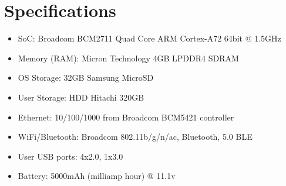 \documentclass[12pt]{article}
\begin{document}
\pagebreak

\section{Specifications}
\begin{itemize}
\item SoC: Broadcom BCM2711 Quad Core ARM Cortex-A72 64bit @ 1.5GHz
\item Memory (RAM): Micron Technology 4GB LPDDR4 SDRAM
\item OS Storage: 32GB Samsung MicroSD
\item User Storage: HDD Hitachi 320GB
\item Ethernet: 10/100/1000 from Broadcom BCM5421 controller 
\item WiFi/Bluetooth: Broadcom 802.11b/g/n/ac, Bluetooth, 5.0 BLE
\item User USB ports: 4x2.0, 1x3.0
\item Battery: 5000mAh (milliamp hour) @ 11.1v
\end{itemize}
\end{document}
